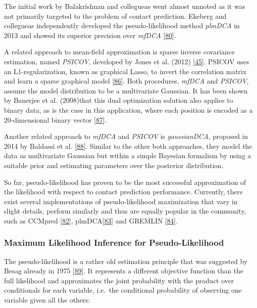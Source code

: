 \documentclass[12pt,a4paper,twoside]{book}
\theoremstyle{definition}
\theoremstyle{definition}
\theoremstyle{remark}
\begin{document}
The initial work by Balakrishnan and collegueas went almost unnoted as
it was not primarily targeted to the problem of contact prediction.
Ekeberg and collegueas independently developed the pseudo-likelihood
method \emph{plmDCA} in 2013 and showed its superior precision over
\emph{mfDCA} {[}\protect\hyperlink{ref-Ekeberg2013}{80}{]}.

A related approach to mean-field approximation is sparse inverse
covariance estimation, named \emph{PSICOV}, developed by Jones et al.
(2012) {[}\protect\hyperlink{ref-Jones2012}{45}{]}. PSICOV uses an
L1-regularization, known as graphical Lasso, to invert the correlation
matrix and learn a sparse graphical model
{[}\protect\hyperlink{ref-Friedman2008}{86}{]}. Both procedures,
\emph{mfDCA} and \emph{PSICOV}, assume the model distribution to be a
multivariate Gaussian. It has been shown by Banerjee et al. (2008)that
this dual optimization solution also applies to binary data, as is the
case in this application, where each position is encoded as a
20-dimensional binary vector
{[}\protect\hyperlink{ref-Banerjee2008}{87}{]}.

Another related approach to \emph{mfDCA} and \emph{PSICOV} is
\emph{gaussianDCA}, proposed in 2014 by Baldassi et al.
{[}\protect\hyperlink{ref-Baldassi2014}{88}{]}. Similar to the other
both approaches, they model the data as multivariate Gaussian but within
a simple Bayesian formalism by using a suitable prior and estimating
parameters over the posterior distribution.

So far, pseudo-likelihood has proven to be the most successful
approximation of the likelihood with respect to contact prediction
performance. Currently, there exist several implementations of
pseudo-likelihood maximization that vary in slight details, perform
similarly and thus are equally popular in the community, such as CCMpred
{[}\protect\hyperlink{ref-Seemayer2014}{82}{]},
plmDCA{[}\protect\hyperlink{ref-Ekeberg2014}{83}{]} and GREMLIN
{[}\protect\hyperlink{ref-Kamisetty2013}{84}{]}.

\subsubsection{Maximum Likelihood Inference for
Pseudo-Likelihood}\label{pseudo-likelihood}

The pseudo-likelihood is a rather old estimation principle that was
suggested by Besag already in 1975
{[}\protect\hyperlink{ref-Besag1975}{89}{]}. It represents a different
objective function than the full likelihood and approximates the joint
probability with the product over conditionals for each variable,
i.e.~the conditional probability of observing one variable given all the
others:
\end{document}
